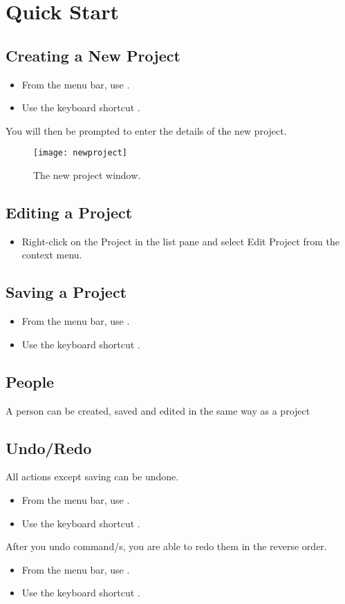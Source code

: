 \documentclass[11pt,fleqn]{book} %
\begin{document}
\section{Quick Start}
\subsection{Creating a New Project}
\begin{itemize}
  \item From the menu bar, use .
  \item Use the keyboard shortcut .
\end{itemize}
You will then be prompted to enter the details of the new project.

\begin{figure}[h]
  \centering
  \texttt{[image: newproject]}
  \caption{The new project window.\label{newproject}}
\end{figure}

\subsection{Editing a Project}
\begin{itemize}
  \item Right-click on the Project in the list pane and select Edit Project from the context menu.
\end{itemize}

\subsection{Saving a Project}
\begin{itemize}
  \item From the menu bar, use .
  \item Use the keyboard shortcut .
\end{itemize}

\subsection{People}
A person can be created, saved and edited in the same way as a project

\subsection{Undo/Redo}
All actions except saving can be undone.
\begin{itemize}
  \item From the menu bar, use .
  \item Use the keyboard shortcut .
\end{itemize}
After you undo command/s, you are able to redo them in the reverse order.
\begin{itemize}
  \item From the menu bar, use .
  \item Use the keyboard shortcut .
\end{itemize}
\end{document}
